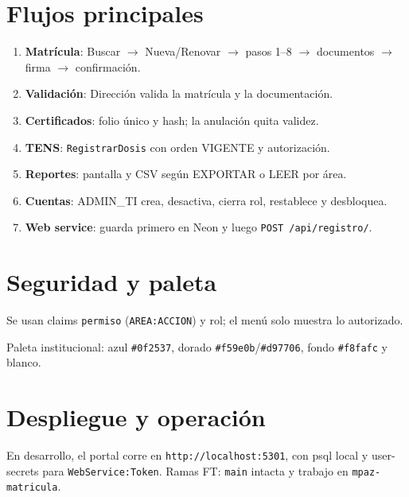 \documentclass[11pt,a4paper]{article}
\newcommand{\codigo}[1]{\texttt{\color{mpazAzul}#1}}
\begin{document}
\section{Flujos principales}
\begin{enumerate}[leftmargin=*,itemsep=0.3em]
\item \textbf{Matrícula}: Buscar $\rightarrow$ Nueva/Renovar $\rightarrow$
  pasos 1--8 $\rightarrow$ documentos $\rightarrow$ firma $\rightarrow$ confirmación.
\item \textbf{Validación}: Dirección valida la matrícula y la documentación.
\item \textbf{Certificados}: folio único y hash; la anulación quita validez.
\item \textbf{TENS}: \codigo{RegistrarDosis} con orden VIGENTE y autorización.
\item \textbf{Reportes}: pantalla y CSV según EXPORTAR o LEER por área.
\item \textbf{Cuentas}: ADMIN\_TI crea, desactiva, cierra rol, restablece y desbloquea.
\item \textbf{Web service}: guarda primero en Neon y luego
  \codigo{POST /api/registro/}.
\end{enumerate}

\section{Seguridad y paleta}
Se usan claims \codigo{permiso} (\codigo{AREA:ACCION}) y rol; el menú solo muestra lo
autorizado.

Paleta institucional: azul \codigo{\#0f2537}, dorado
\codigo{\#f59e0b}/\codigo{\#d97706}, fondo \codigo{\#f8fafc} y blanco.

\section{Despliegue y operación}
En desarrollo, el portal corre en \codigo{http://localhost:5301}, con psql local y
user-secrets para \codigo{WebService:Token}. Ramas FT: \codigo{main} intacta y
trabajo en \codigo{mpaz-matricula}.
\end{document}
